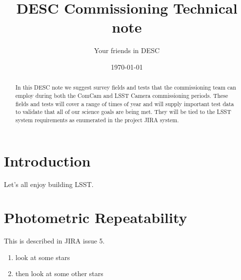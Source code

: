 \documentclass[modern]{desc-tex/styles/lsstdescnote}
\begin{document}
\title{DESC Commissioning Technical note}
\author{Your friends in DESC}
\date{\today}


\begin{abstract}
  In this DESC note we suggest survey fields and tests that the
  commissioning team can employ during both the ComCam and LSST Camera
  commissioning periods.  These fields and tests will cover a range of
  times of year and will supply important test data to validate that
  all of our science goals are being met.  They will be tied to the
  LSST system requirements as enumerated in the project JIRA system.
\end{abstract}

\maketitle

\noindent
\begin{center}
  \fboxsep=5pt  
 \end{center} 
\vspace{0.1in}

\section{Introduction}

Let's all enjoy building LSST.

\section{Photometric Repeatability}

This is described in JIRA issue 5.

\begin{enumerate}
\item look at some stars
\item then look at some other stars
\end{enumerate}

\begin{acknowledgments}

\end{acknowledgments}
  

\end{document}
